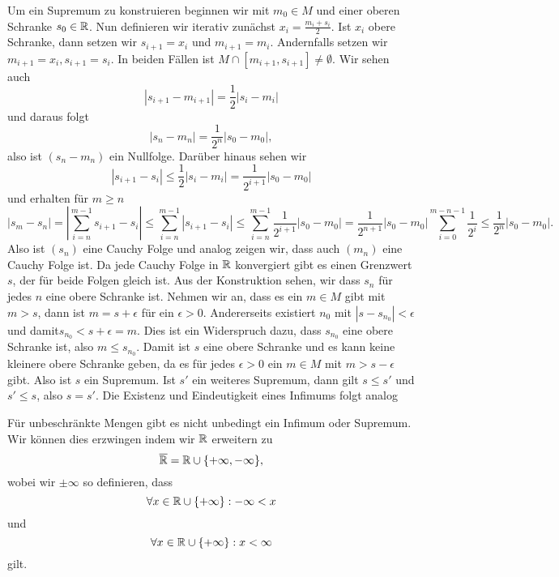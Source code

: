\begin{emphBox}{}{}
Um ein Supremum zu konstruieren beginnen wir mit \(m_0 \in M\) und einer oberen Schranke \(s_0 \in \mathbb{R}\). Nun definieren wir iterativ zunächst \(x_i=\frac{m_i+s_i}2\). Ist \(x_i\) obere Schranke, dann setzen wir \(s_{i+1}=x_i\) und \(m_{i+1}=m_i\). Andernfalls setzen wir \(m_{i+1}=x_i, s_{i+1}=s_i\). In beiden Fällen ist \(M \cap [m_{i+1},s_{i+1}] \neq \emptyset\). Wir sehen auch
\begin{equation*}
|s_{i+1} - m_{i+1}| = \frac{1}2 |s_i - m_i|
\end{equation*}
und daraus folgt
\begin{equation*}
|s_n - m_n| = \frac{1}{2^n} |s_0-m_0|,
\end{equation*}
also ist \((s_n-m_n)\) ein Nullfolge. Darüber hinaus sehen wir
\begin{equation*}
 |s_{i+1}-s_i| \leq \frac{1}2 |s_i - m_i|  = \frac{1}{2^{i+1}} |s_0-m_0|
\end{equation*}
und erhalten für \(m\geq n\)
\begin{equation*}
 |s_m - s_n| = |\sum_{i=n}^{m-1} s_{i+1}-s_i| \leq \sum_{i=n}^{m-1} |s_{i+1}-s_i| \leq  \sum_{i=n}^{m-1}\frac{1}{2^{i+1}} |s_0-m_0| = \frac{1}{2^{n+1}}  |s_0-m_0| \sum_{i=0}^{m-n-1}\frac{1}{2^{i}} \leq \frac{1}{2^{n}}  |s_0-m_0|.
\end{equation*}
Also ist \((s_n)\) eine Cauchy Folge und analog zeigen wir, dass auch \((m_n)\) eine Cauchy Folge ist. Da jede Cauchy Folge in \(\mathbb{R}\) konvergiert gibt es einen Grenzwert \(s\), der für beide Folgen gleich ist. Aus der Konstruktion sehen, wir dass \(s_n\) für jedes \(n\) eine obere Schranke ist. Nehmen wir an, dass es ein \(m \in M\) gibt mit \(m > s\), dann ist \(m=s+\epsilon\) für ein \(\epsilon > 0\). Andererseits existiert \(n_0\) mit \(|s-s_{n_0}|< \epsilon\) und damit\(s_{n_0} < s + \epsilon = m\). Dies ist ein Widerspruch dazu, dass \(s_{n_0}\) eine obere Schranke ist, also \(m \leq s_{n_0}\). Damit ist \(s\) eine obere Schranke und es kann keine kleinere obere Schranke geben, da es für jedes \(\epsilon > 0\) ein \(m \in M\) mit \(m > s-\epsilon\) gibt. Also ist \(s\) ein Supremum. Ist \(s'\) ein weiteres Supremum, dann gilt \(s \leq s'\) und \(s' \leq s\), also \(s=s'\). Die Existenz und Eindeutigkeit eines Infimums folgt analog
\end{emphBox}

Für unbeschränkte Mengen gibt es nicht unbedingt ein Infimum oder Supremum. Wir können dies erzwingen indem wir \(\mathbb{R}\) erweitern zu
\begin{equation*}
 \overline{\mathbb{R}} = \mathbb{R} \cup \{+\infty,-\infty\},
\end{equation*}
wobei wir \(\pm \infty\) so definieren, dass
\begin{equation*}
 \forall x\in \mathbb{R} \cup \{+\infty\} : - \infty < x
\end{equation*}
und
\begin{equation*}
 \forall x\in \mathbb{R} \cup \{+\infty\} : x < \infty\end{equation*}
gilt.


